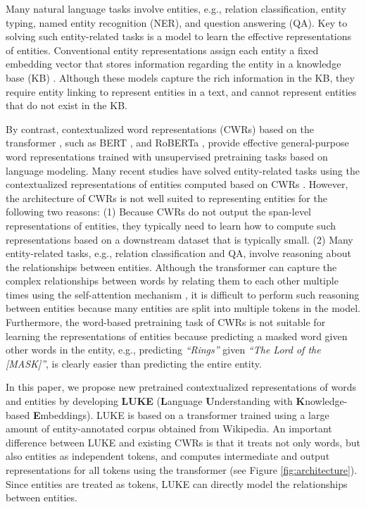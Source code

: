 \documentclass[11pt,a4paper]{article}
\begin{document}
Many natural language tasks involve entities, e.g., relation classification, entity typing, named entity recognition (NER), and question answering (QA). Key to solving such entity-related tasks is a model to learn the effective representations of entities.
Conventional entity representations assign each entity a fixed embedding vector that stores information regarding the entity in a knowledge base (KB) \cite{Bordes2013,Trouillon2016ComplexPrediction,Yamada2016,TACL1065}.
Although these models capture the rich information in the KB, they require entity linking to represent entities in a text, and cannot represent entities that do not exist in the KB.

By contrast, contextualized word representations (CWRs) based on the transformer \cite{NIPS2017_7181}, such as BERT \cite{devlin2018bert}, and RoBERTa \cite{Liu2020RoBERTa:Approach}, provide effective general-purpose word representations trained with unsupervised pretraining tasks based on language modeling.
Many recent studies have solved entity-related tasks using the contextualized representations of entities computed based on CWRs \cite{Zhang2019,peters-knowbert,Joshi2020SpanBERT:Spans}.
However, the architecture of CWRs is not well suited to representing entities for the following two reasons:
(1) Because CWRs do not output the span-level representations of entities, they typically need to learn how to compute such representations based on a downstream dataset that is typically small.
(2) Many entity-related tasks, e.g., relation classification and QA, involve reasoning about the relationships between entities.
Although the transformer can capture the complex relationships between words by relating them to each other multiple times using the self-attention mechanism \cite{Clark2019WhatAttention,Reif2019VisualizingBERT}, it is difficult to perform such reasoning between entities because many entities are split into multiple tokens in the model.
Furthermore, the word-based pretraining task of CWRs is not suitable for learning the representations of entities because predicting a masked word given other words in the entity, e.g., predicting \textit{``Rings''} given \textit{``The Lord of the [MASK]''}, is clearly easier than predicting the entire entity.

In this paper, we propose new pretrained contextualized representations of words and entities by developing \textbf{LUKE} (\textbf{L}anguage \textbf{U}nderstanding with \textbf{K}nowledge-based \textbf{E}mbeddings).
LUKE is based on a transformer \cite{NIPS2017_7181} trained using a large amount of entity-annotated corpus obtained from Wikipedia.
An important difference between LUKE and existing CWRs is that it treats not only words, but also entities as independent tokens, and computes intermediate and output representations for all tokens using the transformer (see Figure \ref{fig:architecture}).
Since entities are treated as tokens, LUKE can directly model the relationships between entities.
\end{document}
